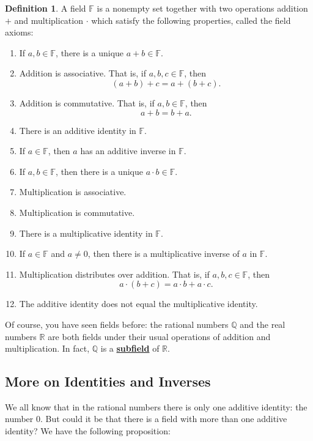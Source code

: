 \documentclass[11pt]{article}
\renewcommand\emph[1]{\underline{\bf{#1}}} %
\theoremstyle{definition}
\newtheorem{definition}[theorem]{Definition}
\begin{document}
\begin{definition} A field $\mathbb{F}$ is a nonempty set together with two operations addition $+$ and multiplication $\cdot$ which satisfy the following
  properties, called the field axioms:
  \begin{enumerate}
    \item If $a,b\in \mathbb{F}$, there is a unique $a+b \in \mathbb{F}$.
    \item Addition is associative. That is, if $a,b,c\in\mathbb{F}$, then
      \[ (a+b)+c = a + (b+c).\]
    \item Addition is commutative. That is, if $a,b\in\mathbb{F}$, then
      \[ a+b = b+a.\]
    \item There is an additive identity in $\mathbb{F}$.
    \item If $a\in \mathbb{F}$, then $a$ has an additive inverse in $\mathbb{F}$.
    \item If $a,b\in\mathbb{F}$, then there is a unique $a\cdot b \in \mathbb{F}$.
    \item Multiplication is associative.
    \item Multiplication is commutative.
    \item There is a multiplicative identity in $\mathbb{F}$.
    \item If $a\in \mathbb{F}$ and $a\neq 0$, then there is a multiplicative inverse of $a$ in $\mathbb{F}$.
    \item Multiplication distributes over addition. That is, if $a,b,c\in\mathbb{F}$, then 
      \[ a\cdot (b+c) = a\cdot b + a\cdot c.\]
    \item The additive identity does not equal the multiplicative identity.
  \end{enumerate}
\end{definition}

Of course, you have seen fields before: the rational numbers $\mathbb{Q}$ and the real numbers $\mathbb{R}$ are both fields under their usual operations of
addition and multiplication. In fact, $\mathbb{Q}$ is a \emph{subfield} of $\mathbb{R}$.

\subsection{More on Identities and Inverses}

We all know that in the rational numbers there is only one additive identity: the number 0. But could it be that there is a field with more than one
additive identity? We have the following proposition:
\end{document}

